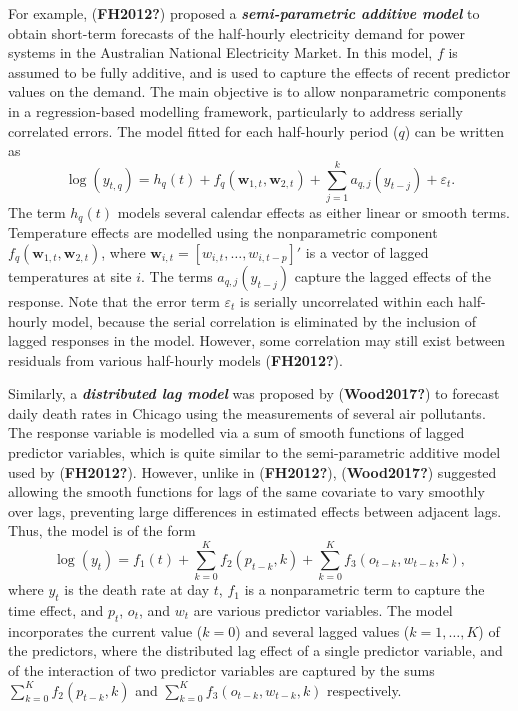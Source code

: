 \documentclass[
  11pt,
  a4paper,
]{report}
\begin{document}
For example, (\textbf{FH2012?}) proposed a \textbf{\emph{semi-parametric
additive model}} to obtain short-term forecasts of the half-hourly
electricity demand for power systems in the Australian National
Electricity Market. In this model, \(f\) is assumed to be fully
additive, and is used to capture the effects of recent predictor values
on the demand. The main objective is to allow nonparametric components
in a regression-based modelling framework, particularly to address
serially correlated errors. The model fitted for each half-hourly period
(\(q\)) can be written as \[
 \log(y_{t,q}) = h_{q}(t) + f_{q}(\bm{w}_{1,t},\bm{w}_{2,t}) + \sum_{j=1}^k a_{q,j}(y_{t-j}) + \varepsilon_{t}.
\] The term \(h_{q}(t)\) models several calendar effects as either
linear or smooth terms. Temperature effects are modelled using the
nonparametric component \(f_{q}(\bm{w}_{1,t},\bm{w}_{2,t})\), where
\(\bm{w}_{i,t} = [w_{i,t},\dots,w_{i,t-p}]'\) is a vector of lagged
temperatures at site \(i\). The terms \(a_{q,j}(y_{t-j})\) capture the
lagged effects of the response. Note that the error term
\(\varepsilon_{t}\) is serially uncorrelated within each half-hourly
model, because the serial correlation is eliminated by the inclusion of
lagged responses in the model. However, some correlation may still exist
between residuals from various half-hourly models (\textbf{FH2012?}).

Similarly, a \textbf{\emph{distributed lag model}} was proposed by
(\textbf{Wood2017?}) to forecast daily death rates in Chicago using the
measurements of several air pollutants. The response variable is
modelled via a sum of smooth functions of lagged predictor variables,
which is quite similar to the semi-parametric additive model used by
(\textbf{FH2012?}). However, unlike in (\textbf{FH2012?}),
(\textbf{Wood2017?}) suggested allowing the smooth functions for lags of
the same covariate to vary smoothly over lags, preventing large
differences in estimated effects between adjacent lags. Thus, the model
is of the form \[
 \log(y_{t}) = f_{1}(t) + \sum_{k=0}^{K} f_{2}(p_{t-k}, k) + \sum_{k=0}^{K} f_{3}(o_{t-k}, w_{t-k}, k),
\] where \(y_{t}\) is the death rate at day \(t\), \(f_{1}\) is a
nonparametric term to capture the time effect, and \(p_t\), \(o_t\), and
\(w_t\) are various predictor variables. The model incorporates the
current value (\(k = 0\)) and several lagged values
(\(k = 1, \dots, K\)) of the predictors, where the distributed lag
effect of a single predictor variable, and of the interaction of two
predictor variables are captured by the sums
\(\sum_{k=0}^{K} f_{2}(p_{t-k}, k)\) and
\(\sum_{k=0}^{K} f_{3}(o_{t-k}, w_{t-k}, k)\) respectively.
\end{document}
